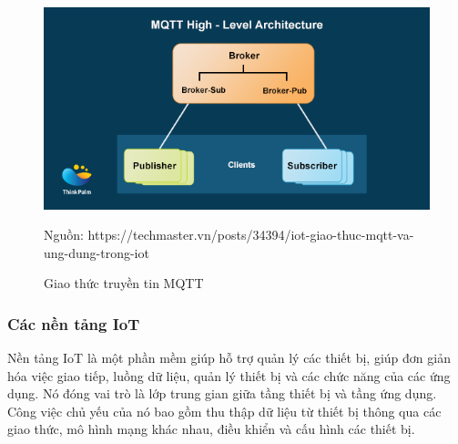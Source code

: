 \clearpage

\begin{figure}[h!]
	\center
	\includegraphics[scale=0.6]{image/mqtt}\\
	\caption{Giao thức truyền tin MQTT}
	Nguồn: https://techmaster.vn/posts/34394/iot-giao-thuc-mqtt-va-ung-dung-trong-iot
\end{figure} 




\subsubsection{Các nền tảng IoT}
Nền tảng IoT là một phần mềm giúp hỗ trợ quản lý các thiết bị, giúp đơn giản hóa việc giao tiếp, luồng dữ liệu, quản lý thiết bị và các chức năng của các ứng dụng. Nó đóng vai trò là lớp trung gian giữa tầng thiết bị và tầng ứng dụng. Công việc chủ yếu của nó bao gồm thu thập dữ liệu từ thiết bị thông qua các giao thức, mô hình mạng khác nhau, điều khiển và cấu hình các thiết bị. 
\clearpage

